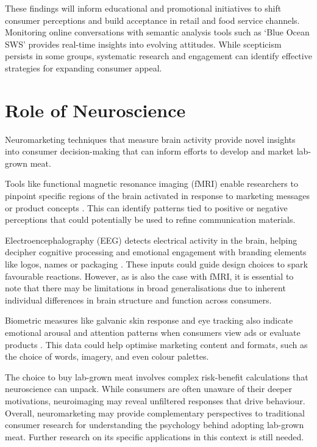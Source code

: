 \documentclass[10pt]{article}
\begin{document}
\begin{sloppypar}
  These findings will inform educational and promotional initiatives to shift consumer perceptions and build acceptance in retail and food service channels. Monitoring online conversations with semantic analysis tools such as ‘Blue Ocean SWS’ provides real-time insights into evolving attitudes. While scepticism persists in some groups, systematic research and engagement can identify effective strategies for expanding consumer appeal.

  \section{Role of Neuroscience}
  \label{sec:role-of-neuroscience}

  Neuromarketing techniques that measure brain activity provide novel insights into consumer decision-making that can inform efforts to develop and market lab-grown meat.

  Tools like functional magnetic resonance imaging (fMRI) enable researchers to pinpoint specific regions of the brain activated in response to marketing messages or product concepts \citep{bryant_consumer_2018}. This can identify patterns tied to positive or negative perceptions that could potentially be used to refine communication materials.

  Electroencephalography (EEG) detects electrical activity in the brain, helping decipher cognitive processing and emotional engagement with branding elements like logos, names or packaging \citep{khushaba_consumer_2013}. These inputs could guide design choices to spark favourable reactions. However, as is also the case with fMRI, it is essential to note that there may be limitations in broad generalisations due to inherent individual differences in brain structure and function across consumers.


  Biometric measures like galvanic skin response and eye tracking also indicate emotional arousal and attention patterns when consumers view ads or evaluate products \citep{riedl_decade_2020}. This data could help optimise marketing content and formats, such as the choice of words, imagery, and even colour palettes.

  The choice to buy lab-grown meat involves complex risk-benefit calculations that neuroscience can unpack. While consumers are often unaware of their deeper motivations, neuroimaging may reveal unfiltered responses that drive behaviour. Overall, neuromarketing may provide complementary perspectives to traditional consumer research for understanding the psychology behind adopting lab-grown meat. Further research on its specific applications in this context is still needed.


\end{sloppypar}
\end{document}
